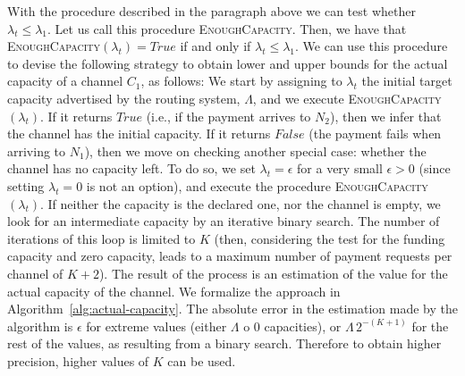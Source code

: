 With the procedure described in the paragraph above we can test whether $\lambda_t \leq \lambda_{1}$. Let us call this procedure \textsc{EnoughCapacity}.
Then, we have that \textsc{EnoughCapacity}$(\lambda_t)=\mathit{True}$ if and only if $\lambda_t \leq \lambda_{1}$. 
We can use this procedure to devise the following strategy to obtain lower and upper bounds for the actual capacity of a channel $C_{1}$, as follows:
We start by assigning to $\lambda_t$ the initial target capacity advertised by the routing system, $\Lambda$, and we execute \textsc{EnoughCapacity}$(\lambda_t)$. If it returns $\mathit{True}$ (i.e., if the payment arrives to $N_2$), then we infer that the channel has the initial capacity.
If it returns $\mathit{False}$ (the payment fails when arriving to $N_1$), then we move on checking another special case: whether the channel has no capacity left. To do so, we set $\lambda_t = \epsilon$ for a very small $\epsilon>0$ (since setting $\lambda_t = 0$ is not an option), and execute the procedure \textsc{EnoughCapacity}$(\lambda_t)$. If neither the capacity is the declared one, nor the channel is empty, 
we look for an intermediate capacity by an iterative binary search. 
The number of iterations of this loop is limited to $K$ (then, considering the test for the funding capacity and zero capacity, leads to a maximum number of payment requests per channel of $K+2$).
The result of the process is an estimation of the value for the actual capacity of the channel. 
We formalize the approach in Algorithm~\ref{alg:actual-capacity}.
The absolute error in the estimation made by the algorithm is $\epsilon$ for extreme values (either $\Lambda$ o 0 capacities), 
or $\Lambda \, 2^{-(K+1)}$ for the rest of the values, as resulting from a binary search. 
Therefore to obtain higher precision, higher values of $K$ can be used.

